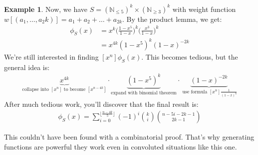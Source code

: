\documentclass[]{article}
\theoremstyle{definition}
\newtheorem{ex}{Example}[section]
\begin{document}
\begin{ex}
					Now, we have $S = (\mathbb{N}_{\le 5})^k \times (\mathbb{N}_{\ge 3})^k$ with weight function $w[(a_1, \ldots, a_2k)] = a_1 + a_2 + \ldots + a_{2k}$. By the product lemma, we get:
					\begin{align*}
						\phi_S(x) &= x^k \bigg(\frac{1 - x^5}{1 - x}\bigg)^k \bigg( \frac{x^3}{1 - x} \bigg)^k \\
						&= x^{4k}(1 - x^5)^k (1-x)^{-2k}
					\end{align*}
					We're still interested in finding $[x^n]\phi_S(x)$. This becomes tedious, but the general idea is:
					\begin{align*}
						[x^n] \underbrace{x^{4k}}_{\text{collapse into } [x^n] \text{ to become } [x^{n - 4k}]} \cdot \underbrace{(1 - x^5)^k}_{\text{expand with binomial theorem}} \cdot \underbrace{(1 - x)^{-2k}}_{\text{ use formula } [x^n]\frac{1}{(1 - x)^k}}
					\end{align*}
					After much tedious work, you'll discover that the final result is:
					\begin{align*}
						[x^n] \phi_S(x) = \sum_{i = 0}^{\lfloor \frac{n - 4k}{5} \rfloor} (-1)^i {k \choose i} {n - 5i - 2k - 1 \choose 2k - 1}
					\end{align*}

					This couldn't have been found with a combinatorial proof. That's why generating functions are powerful \textendash{} they work even in convoluted situations like this one.
				\end{ex}
\end{document}
